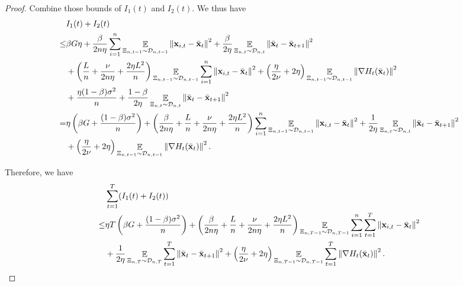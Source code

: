 \documentclass{article}
\begin{document}
\begin{proof}
Combine those bounds of $I_1(t)$ and $I_2(t)$. We thus have
\begin{align}
\nonumber
& I_1(t) + I_2(t) \\ \nonumber 
\le & \beta G \eta + \frac{\beta}{2n\eta }\sum_{i=1}^n \mathop{\mathbb{E}}_{ \Xi_{n,t-1} \sim \mathcal{D}_{n,t-1} }\left\lVert{\bf x}_{i,t} - \bar{{\bf x}}_t\right\rVert^2 + \frac{\beta }{2\eta } \mathop{\mathbb{E}}_{ \Xi_{n,t} \sim \mathcal{D}_{n,t} }\left\lVert\bar{{\bf x}}_t - \bar{{\bf x}}_{t+1}\right\rVert^2 \\ \nonumber
& + \left(  \frac{L}{n} + \frac{\nu}{2n\eta} + \frac{2\eta L^2}{n}  \right)\mathop{\mathbb{E}}_{ \Xi_{n,t-1} \sim \mathcal{D}_{n,t-1} }\sum_{i=1}^n\left\lVert{\bf x}_{i,t} - \bar{{\bf x}}_t \right\rVert^2   + \left(  \frac{\eta}{2\nu} + 2\eta  \right)\mathop{\mathbb{E}}_{ \Xi_{n,t-1} \sim \mathcal{D}_{n,t-1} }\left\lVert\nabla H_t(\bar{{\bf x}}_t)\right\rVert^2 \\ \nonumber 
&+ \frac{\eta (1-\beta)\sigma^2}{n} +  \frac{1-\beta}{2\eta} \mathop{\mathbb{E}}_{ \Xi_{n,t} \sim \mathcal{D}_{n,t} }\left\lVert \bar{{\bf x}}_t - \bar{{\bf x}}_{t+1}\right\rVert^2 \\ \nonumber
= & \eta\left(  \beta G + \frac{(1-\beta)\sigma^2}{n} \right) + \left( \frac{\beta}{2n\eta } +\frac{L}{n} + \frac{\nu}{2n\eta} + \frac{2\eta L^2}{n}  \right)\sum_{i=1}^n \mathop{\mathbb{E}}_{ \Xi_{n,t-1} \sim \mathcal{D}_{n,t-1} }\left\lVert{\bf x}_{i,t} - \bar{{\bf x}}_t\right\rVert^2 + \frac{1}{2\eta } \mathop{\mathbb{E}}_{ \Xi_{n,t} \sim \mathcal{D}_{n,t} }\left\lVert\bar{{\bf x}}_t - \bar{{\bf x}}_{t+1}\right\rVert^2 \\ \nonumber
&  + \left(  \frac{\eta}{2\nu} + 2\eta  \right)\mathop{\mathbb{E}}_{ \Xi_{n,t-1} \sim \mathcal{D}_{n,t-1} }\left\lVert\nabla H_t(\bar{{\bf x}}_t)\right\rVert^2. 
\end{align}

Therefore, we have 
\begin{align}
\nonumber
&\sum_{t=1}^T (I_1(t) + I_2(t)) \\ \nonumber
\le & \eta T \left(  \beta G + \frac{(1-\beta)\sigma^2}{n} \right) + \left( \frac{\beta}{2n\eta } +\frac{L}{n} + \frac{\nu}{2n\eta} + \frac{2\eta L^2}{n}  \right) \mathop{\mathbb{E}}_{ \Xi_{n,T-1} \sim \mathcal{D}_{n,T-1} }\sum_{i=1}^n \sum_{t=1}^T \left\lVert{\bf x}_{i,t} - \bar{{\bf x}}_t\right\rVert^2  \\ \nonumber
& + \frac{1}{2\eta } \mathop{\mathbb{E}}_{ \Xi_{n,T} \sim \mathcal{D}_{n,T} }\sum_{t=1}^T \left\lVert\bar{{\bf x}}_t - \bar{{\bf x}}_{t+1}\right\rVert^2 + \left(  \frac{\eta}{2\nu} + 2\eta  \right)\mathop{\mathbb{E}}_{ \Xi_{n,T-1} \sim \mathcal{D}_{n,T-1} }\sum_{t=1}^T\left\lVert\nabla H_t(\bar{{\bf x}}_t)\right\rVert^2.
\end{align} 





\end{proof}
\end{document}
